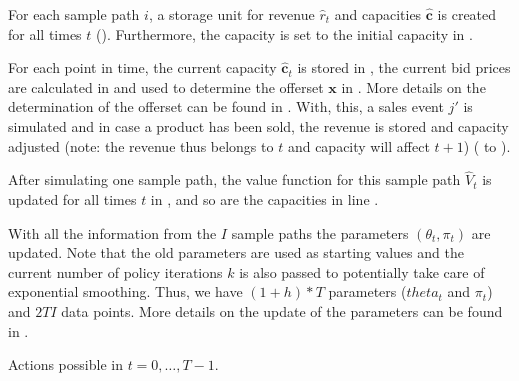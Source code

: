 For each sample path $i$, a storage unit for revenue $\hat{r}_t$ and capacities $\mathbf{\hat{c}}$ is created for all times $t$ (). Furthermore, the capacity is set to the initial capacity in .

For each point in time, the current capacity $\mathbf{\hat{c}}_t$ is stored in , the current bid prices are calculated in  and used to determine the offerset $\mathbf{x}$ in . More details on the determination of the offerset can be found in . With, this, a sales event $j'$ is simulated and in case a product has been sold, the revenue is stored and capacity adjusted (note: the revenue thus belongs to $t$ and capacity will affect $t+1$) ( to ).

After simulating one sample path, the value function for this sample path $\hat{V}_t$ is updated for all times $t$ in , and so are the capacities in line .

With all the information from the $I$ sample paths the parameters $\left(\theta_t, \pi_t \right)$ are updated. Note that the old parameters are used as starting values and the current number of policy iterations $k$ is also passed to potentially take care of exponential smoothing. Thus, we have $(1+h)*T$ parameters ($theta_t$ and $\pi_t$) and $2TI$ data points. More details on the update of the parameters can be found in .

Actions possible in $t = 0, \dots, T-1$.


